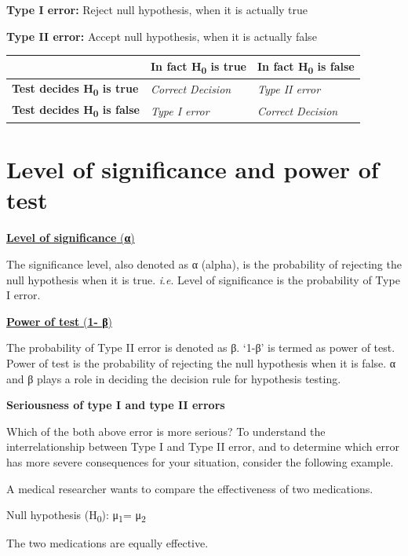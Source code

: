 \documentclass[
]{book}
\begin{document}
\textbf{Type I error:} Reject null hypothesis, when it is actually true

\textbf{Type II error:} Accept null hypothesis, when it is actually false~

\begin{longtable}[]{@{}lll@{}}
\toprule\noalign{}
& \textbf{In fact H\textsubscript{0} is true} & \textbf{In fact H\textsubscript{0} is false} \\
\midrule\noalign{}
\endhead
\bottomrule\noalign{}
\endlastfoot
\textbf{Test decides H\textsubscript{0} is true} & \emph{Correct Decision} & \emph{Type II error} \\
\textbf{Test decides H\textsubscript{0} is false} & \emph{Type I error} & \emph{Correct Decision} \\
\end{longtable}

\hypertarget{level-of-significance-and-power-of-test}{%
\section{Level of significance and power of test}\label{level-of-significance-and-power-of-test}}

\ul{\textbf{Level of significance} (\textbf{α})}

The significance level, also denoted as α (alpha), is the probability of rejecting the null hypothesis when it is true. \emph{i}.\emph{e}. Level of significance is the probability of Type I error.

\ul{\textbf{Power of test} (\textbf{1- β})}

The probability of Type II error is denoted as β. `1-β' is termed as power of test. Power of test is the probability of rejecting the null hypothesis when it is false. α and β plays a role in deciding the decision rule for hypothesis testing.

\textbf{Seriousness of type I and type II errors}

Which of the both above error is more serious? To understand the interrelationship between Type I and Type II error, and to determine which error has more severe consequences for your situation, consider the following example.

A medical researcher wants to compare the effectiveness of two medications.

Null hypothesis (H\textsubscript{0}): μ\textsubscript{1}= μ\textsubscript{2}

The two medications are equally effective.
\end{document}
